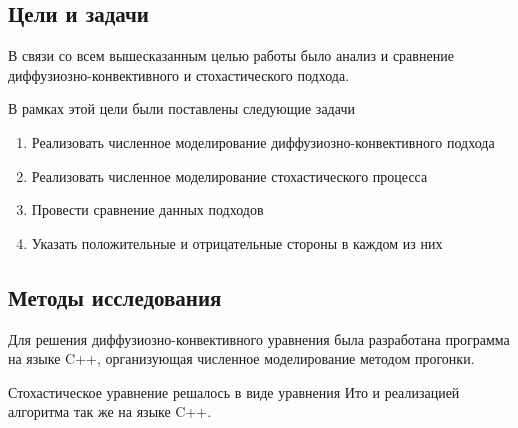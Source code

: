 \documentclass[a4paper,11pt]{article} %
\begin{document}
\subsection{Цели и задачи}
В связи со всем вышесказанным целью работы было анализ и сравнение диффузиозно-конвективного и стохастического подхода.

В рамках этой цели были поставлены следующие задачи
\begin{enumerate}
\item Реализовать численное моделирование диффузиозно-конвективного подхода
\item Реализовать численное моделирование стохастического процесса
\item Провести сравнение данных подходов
\item Указать положительные и отрицательные стороны в каждом из них
\end{enumerate}

\subsection{Методы исследования}
Для решения диффузиозно-конвективного уравнения была разработана программа на языке C++, организующая численное моделирование методом прогонки.

Стохастическое уравнение решалось в виде уравнения Ито и реализацией алгоритма так же на языке C++.



\end{document}
